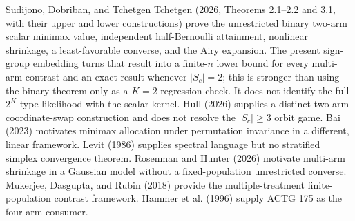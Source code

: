 Sudijono, Dobriban, and Tchetgen Tchetgen (2026, Theorems 2.1--2.2 and 3.1, with their upper and lower constructions) prove the unrestricted binary two-arm scalar minimax value, independent half-Bernoulli attainment, nonlinear shrinkage, a least-favorable converse, and the Airy expansion.  The present sign-group embedding turns that result into a finite-\(n\) lower bound for every multi-arm contrast and an exact result whenever \(|S_c|=2\); this is stronger than using the binary theorem only as a \(K=2\) regression check.  It does not identify the full \(2^K\)-type likelihood with the scalar kernel.  Hull (2026) supplies a distinct two-arm coordinate-swap construction and does not resolve the \(|S_c|\geq3\) orbit game.  Bai (2023) motivates minimax allocation under permutation invariance in a different, linear framework.  Levit (1986) supplies spectral language but no stratified simplex convergence theorem.  Rosenman and Hunter (2026) motivate multi-arm shrinkage in a Gaussian model without a fixed-population unrestricted converse.  Mukerjee, Dasgupta, and Rubin (2018) provide the multiple-treatment finite-population contrast framework.  Hammer et al. (1996) supply ACTG 175 as the four-arm consumer.
